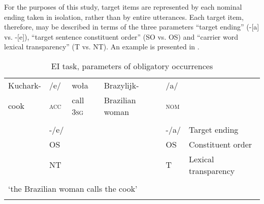 \begin{table}
    \caption{EI task, target sentences}
    \label{tab:02:11}
\end{table}

\largerpage

For the purposes of this study, target items are represented by each nominal ending taken in isolation, rather than by entire utterances. Each target item, therefore, may be described in terms of the three parameters “target ending” (-[a] vs. -[e]), “target sentence constituent order” (SO vs. OS) and “carrier word lexical transparency” (T vs. NT). An example is presented in .

\begin{table}[b]
    \begin{tabularx}{\textwidth}{llllll}
    \lsptoprule
         {Kuchark-} & {/e/} & {woła} &  {Brazylijk-} & {/a/} & \\
          cook & \textsc{acc} & call \textsc{3sg} &  Brazilian woman & \textsc{nom} & \\
        &  &  &  &  & \\
        & {}-/e/ &  &  & {}-/a/ & Target ending\\
        & OS &  &  & OS & Constituent order\\
        & NT &  &  & T & Lexical transparency\\
        \multicolumn{5}{c}{} & \\
        \multicolumn{5}{l}{‘the Brazilian woman calls the cook’} & \\
    \lspbottomrule
    \end{tabularx}
    \caption{EI task, parameters of obligatory occurrences}
    \label{tab:02:12}
\end{table}

